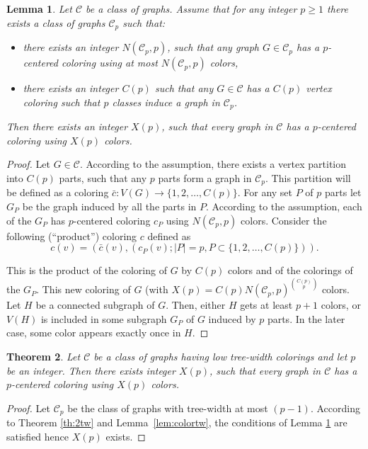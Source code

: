 \documentclass[a4paper]{amsart}
\newtheorem{theorem}{Theorem}[section]
\newtheorem{lemma}[theorem]{Lemma}
\theoremstyle{definition}
\theoremstyle{remark}
\begin{document}
\begin{lemma}
\label{lem:colind}
Let $\mathcal C$ be a class of graphs. Assume that for any integer
$p\geq 1$
there exists a class of graphs $\mathcal C_p$ such that:
\begin{itemize}
\item there exists an integer $N(\mathcal C_p,p)$, such that any graph
$G\in\mathcal C_p$ has a $p$-centered coloring using at most $N(\mathcal
C_p,p)$ colors,
\item there exists an integer $C(p)$ such that any $G\in\mathcal C$
has a $C(p)$ vertex coloring such that $p$ classes induce a graph in
$\mathcal C_p$.
\end{itemize}
Then there exists an integer $X(p)$,
such that every graph in $\mathcal C$ has a $p$-centered
coloring using $X(p)$ colors.
\end{lemma}
\begin{proof}
Let $G\in\mathcal C$. According to the assumption, there exists a
vertex partition into 
$C(p)$ parts, such that any $p$ parts form a graph in $\mathcal C_p$.
This partition will be defined as a
coloring $\bar{c}: V(G) \longrightarrow \{1,2,\ldots,C(p)\}$. For
any set $P$ of $p$ parts let $G_P$ be the graph induced by all the
parts in $P$. According to the assumption, each of the
$G_P$ has $p$-centered coloring $c_P$ using $N(\mathcal C_p,p)$ colors.
Consider the following (``product'') coloring $c$ defined as
\begin{equation*}
c(v) = (\bar{c}(v), (c_P(v); |P| = p, P \subset \{1,2,\ldots,C(p)\})).
\end{equation*}

This is the product of the coloring of $G$ by $C(p)$ colors and of the
colorings of the $G_P$. This new coloring of $G$ (with $X(p)=C(p)
N(\mathcal C_p,p)^{\binom{C(p)}{p}}$ colors. Let $H$ be a connected
subgraph of $G$. Then, either $H$ gets at least $p+1$ colors, or
$V(H)$ is included in some subgraph $G_P$ of $G$ induced by $p$
parts. In the later case, some color appears exactly once in $H$.
\end{proof}

\begin{theorem}
\label{th:col}
Let $\mathcal C$ be a class of graphs having low tree-width colorings
and let $p$ be an integer. Then there exists integer $X(p)$,
such that every graph in $\mathcal C$ has a $p$-centered
coloring using $X(p)$ colors.
\end{theorem}

\begin{proof}
Let $\mathcal C_p$ be the class of graphs with tree-width at most
$(p-1)$. According to Theorem \ref{th:2tw} and
Lemma~\ref{lem:colortw}, the conditions of Lemma \ref{lem:colind} are
satisfied hence $X(p)$ exists.
\end{proof}
\end{document}
